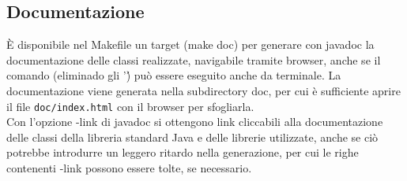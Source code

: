 \subsection{Documentazione}
È disponibile nel Makefile un target (make doc) per generare con javadoc la documentazione delle classi realizzate, navigabile tramite browser, anche se il comando (eliminado gli '\') può essere eseguito anche da terminale. La documentazione viene generata nella subdirectory doc, per cui è sufficiente aprire il file \verb|doc/index.html| con il browser per sfogliarla.\\
Con l'opzione -link di javadoc si ottengono link cliccabili alla documentazione delle classi della libreria standard Java e delle librerie utilizzate, anche se ciò potrebbe introdurre un leggero ritardo nella generazione, per cui le righe contenenti -link possono essere tolte, se necessario.\\